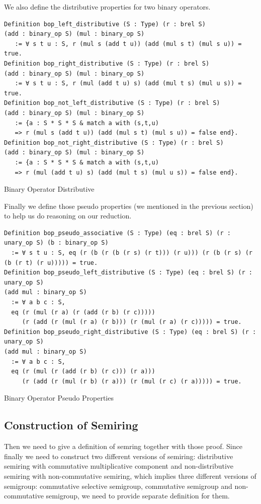\documentclass[a4paper,12pt,twoside,openright]{report}
\begin{document}
We also define the distributive properties for two binary operators.
\begin{listing}[H]
\begin{verbatim}
Definition bop_left_distributive (S : Type) (r : brel S) 
(add : binary_op S) (mul : binary_op S) 
   := ∀ s t u : S, r (mul s (add t u)) (add (mul s t) (mul s u)) = true. 
Definition bop_right_distributive (S : Type) (r : brel S) 
(add : binary_op S) (mul : binary_op S) 
   := ∀ s t u : S, r (mul (add t u) s) (add (mul t s) (mul u s)) = true. 
Definition bop_not_left_distributive (S : Type) (r : brel S) 
(add : binary_op S) (mul : binary_op S) 
   := {a : S * S * S & match a with (s,t,u) 
   => r (mul s (add t u)) (add (mul s t) (mul s u)) = false end}. 
Definition bop_not_right_distributive (S : Type) (r : brel S) 
(add : binary_op S) (mul : binary_op S) 
   := {a : S * S * S & match a with (s,t,u) 
   => r (mul (add t u) s) (add (mul t s) (mul u s)) = false end}.
\end{verbatim}
\caption{Binary Operator Distributive} 
\label{coq:def:binary_properties_distributive}
\end{listing}

Finally we define those pseudo properties (we mentioned in the previous section) to help us do reasoning on our reduction.

\begin{listing}[H]
\begin{verbatim}
Definition bop_pseudo_associative (S : Type) (eq : brel S) (r : unary_op S) (b : binary_op S) 
  := ∀ s t u : S, eq (r (b (r (b (r s) (r t))) (r u))) (r (b (r s) (r (b (r t) (r u))))) = true.
Definition bop_pseudo_left_distributive (S : Type) (eq : brel S) (r : unary_op S) 
(add mul : binary_op S) 
  := ∀ a b c : S, 
  eq (r (mul (r a) (r (add (r b) (r c))))) 
     (r (add (r (mul (r a) (r b))) (r (mul (r a) (r c))))) = true.          
Definition bop_pseudo_right_distributive (S : Type) (eq : brel S) (r : unary_op S) 
(add mul : binary_op S) 
  := ∀ a b c : S, 
  eq (r (mul (r (add (r b) (r c))) (r a))) 
     (r (add (r (mul (r b) (r a))) (r (mul (r c) (r a))))) = true.

\end{verbatim}
\caption{Binary Operator Pseudo Properties} 
\label{coq:def:binary_properties_pseudo}
\end{listing}

\subsection{Construction of Semiring}
Then we need to give a definition of semring together with those proof. Since finally we need to construct two different versions of semiring: distributive semiring with commutative multiplicative component and non-distributive semiring with non-commutative semiring, which implies three different versions of semigroup: commutative selective semigroup, commutative semigroup and non-commutative semigroup, we need to provide separate definition for them.
\end{document}
